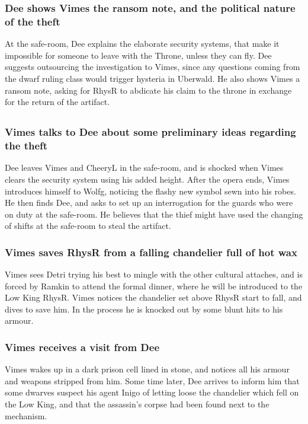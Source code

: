 \subsubsection{\Gls{Dee} shows \Gls{Vimes} the ransom note, and the political nature of the theft}
At the safe-room, \Gls{Dee} explains the elaborate security systems, that make it impossible for
someone to leave with the Throne, unless they can fly. \Gls{Dee} suggests outsourcing the
investigation to \Gls{Vimes}, since any questions coming from the dwarf ruling class would trigger
hysteria in Uberwald. He also shows \Gls{Vimes} a ransom note, asking for \Gls{RhysR} to abdicate
his claim to the throne in exchange for the return of the artifact.

\subsection{}
\subsubsection{\Gls{Vimes} talks to \Gls{Dee} about some preliminary ideas regarding the theft}
\Gls{Dee} leaves \Gls{Vimes} and \Gls{CheeryL} in the safe-room, and is shocked when \Gls{Vimes}
clears the security system using his added height. After the opera ends, \Gls{Vimes} introduces
himself to \Gls{Wolfg}, noticing the flashy new symbol sewn into his robes. He then finds \Gls{Dee},
and asks to set up an interrogation for the guards who were on duty at the safe-room. He believes
that the thief might have used the changing of shifts at the safe-room to steal the artifact.

\subsubsection{\Gls{Vimes} saves \Gls{RhysR} from a falling chandelier full of hot wax}
\Gls{Vimes} sees \Gls{Detri} trying his best to mingle with the other cultural attaches, and is
forced by \Gls{Ramkin} to attend the formal dinner, where he will be introduced to the Low King
\Gls{RhysR}. \Gls{Vimes} notices the chandelier set above \Gls{RhysR} start to fall, and dives to
save him. In the process he is knocked out by some blunt hits to his armour.

\subsubsection{\Gls{Vimes} receives a visit from \Gls{Dee}}
\Gls{Vimes} wakes up in a dark prison cell lined in stone, and notices all his armour and weapons
stripped from him. Some time later, \Gls{Dee} arrives to inform him that some dwarves suspect his
agent \Gls{Inigo} of letting loose the chandelier which fell on the Low King, and that the
assassin's corpse had been found next to the mechanism.

